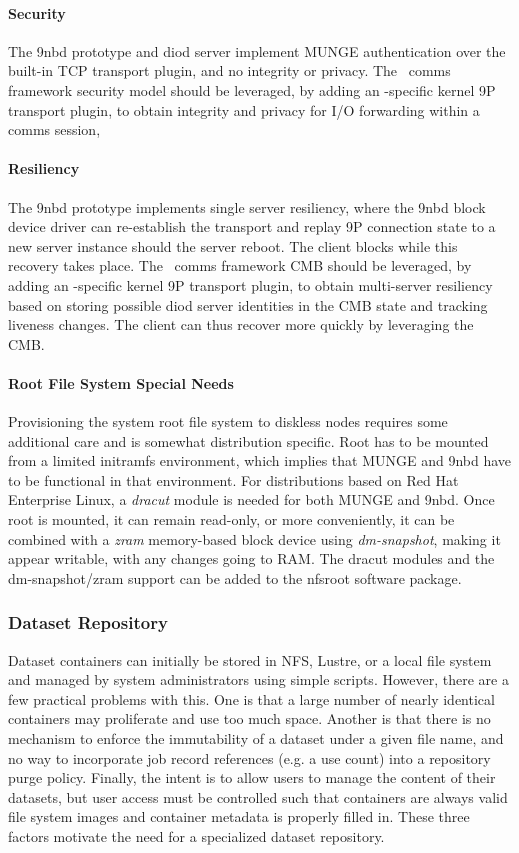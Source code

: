 \paragraph{Security}
The 9nbd prototype and diod server implement MUNGE authentication
over the built-in TCP transport plugin, and no integrity or privacy.
The \ngrm\ comms framework security model should be leveraged,
by adding an \ngrm-specific kernel 9P transport plugin,
to obtain integrity and privacy for I/O forwarding within a comms session,

\paragraph{Resiliency}
The 9nbd prototype implements single server resiliency, where the
9nbd block device driver can re-establish the transport and replay
9P connection state to a new server instance should the server reboot.
The client blocks while this recovery takes place.
The \ngrm\ comms framework CMB should be leveraged,
by adding an \ngrm-specific kernel 9P transport plugin,
to obtain multi-server resiliency based on storing possible diod server
identities in the CMB state and tracking liveness changes.
The client can thus recover more quickly by leveraging the CMB.

\paragraph{Root File System Special Needs}
Provisioning the system root file system to diskless nodes requires
some additional care and is somewhat distribution specific.
Root has to be mounted from a limited initramfs environment, which
implies that MUNGE and 9nbd have to be functional in that environment.
For distributions based on Red Hat Enterprise Linux, a {\em dracut}
module is needed for both MUNGE and 9nbd.  Once root is mounted, it can
remain read-only, or more conveniently, it can be combined with a {\em zram}
memory-based block device using {\em dm-snapshot}, making it appear
writable, with any changes going to RAM.  The dracut modules and the
dm-snapshot/zram support can be added to the nfsroot\cite{nfsroot}
software package.

\subsubsection{Dataset Repository}

Dataset containers can initially be stored in NFS, Lustre, or a local file
system and managed by system administrators using simple scripts.
However, there are a few practical problems with this.
One is that a large number of nearly identical containers may proliferate
and use too much space.  Another is that there is no mechanism to enforce
the immutability of a dataset under a given file name, and no way
to incorporate job record references (e.g. a use count) into a repository
purge policy.
Finally, the intent is to allow users to manage the content of their datasets,
but user access must be controlled such that containers are always
valid file system images and container metadata is properly filled in.
These three factors motivate the need for a specialized dataset repository.

